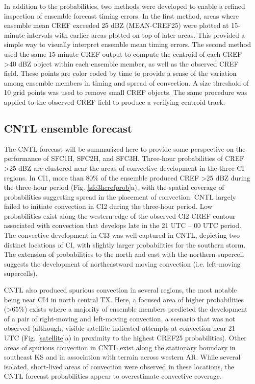 In addition to the probabilities, two methods were developed to enable a refined inspection of ensemble forecast timing errors. In the first method, areas where ensemble mean CREF exceeded 25 dBZ (MEAN-CREF25) were plotted at 15-minute intervals with earlier areas plotted on top of later areas. This provided a simple way to visually interpret ensemble mean timing errors. The second method used the same 15-minute CREF output to compute the centroid of each CREF \textgreater 40 dBZ object within each ensemble member, as well as the observed CREF field. These points are color coded by time to provide a sense of the variation among ensemble members in timing and spread of convection. A size threshold of 10 grid points was used to remove small CREF objects. The same procedure was applied to the observed CREF field to produce a verifying centroid track.

\subsection{CNTL ensemble forecast}
The CNTL forecast will be summarized here to provide some perspective on the performance of SFC1H, SFC2H, and SFC3H. Three-hour probabilities of CREF \textgreater 25 dBZ are clustered near the areas of convective development in the three CI regions. In CI1, more than 80\% of the ensemble produced CREF \textgreater 25 dBZ during the three-hour period (Fig. \ref{sfc3hcrefprob}a), with the spatial coverage of probabilities suggesting spread in the placement of convection. CNTL largely failed to initiate convection in CI2 during the three-hour period. Low probabilities exist along the western edge of the observed CI2 CREF contour associated with convection that develops late in the 21 UTC -- 00 UTC period. The convective development in CI3 was well captured in CNTL, depicting two distinct locations of CI, with slightly larger probabilities for the southern storm. The extension of probabilities to the north and east with the northern supercell suggests the development of northeastward moving convection (i.e. left-moving supercells).

CNTL also produced spurious convection in several regions, the most notable being near CI4 in north central TX. Here, a focused area of higher probabilities (\textgreater 65\%) exists where a majority of ensemble members predicted the development of a pair of right-moving and left-moving convection, a scenario that was not observed (although, visible satellite indicated attempts at convection near 21 UTC (Fig. \ref{satellite}a) in proximity to the highest CREF25 probabilities). Other areas of spurious convection in CNTL exist along the stationary boundary in southeast KS and in association with terrain across western AR. While several isolated, short-lived areas of convection were observed in these locations, the CNTL forecast probabilities appear to overestimate convective coverage.

